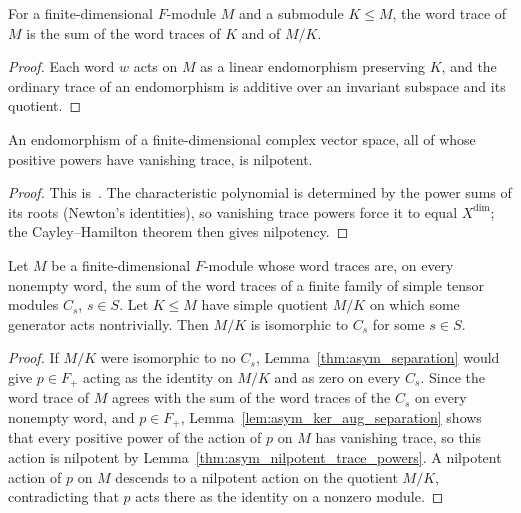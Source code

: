 \begin{lemma}
    \label{lem:asym_trace_additivity}
    \leanok
    For a finite-dimensional $F$-module $M$ and a submodule $K\leq M$, the
    word trace of $M$ is the sum of the word traces of $K$ and of $M/K$.
\end{lemma}

\begin{proof}
    \leanok
    Each word $w$ acts on $M$ as a linear endomorphism preserving $K$, and the
    ordinary trace of an endomorphism is additive over an invariant subspace
    and its quotient.
\end{proof}

\begin{lemma}
    \label{thm:asym_nilpotent_trace_powers}
    \leanok
    An endomorphism of a finite-dimensional complex vector space, all of
    whose positive powers have vanishing trace, is nilpotent.
\end{lemma}

\begin{proof}
    \leanok
    This is~\cite[``Nilpotency from vanishing trace
        powers'']{QICLean2026Blueprint}.
    The characteristic polynomial is determined by the power sums of its
    roots (Newton's identities), so vanishing trace powers force it to
    equal $X^{\dim}$; the Cayley--Hamilton theorem then gives nilpotency.
\end{proof}

\begin{lemma}
    \label{thm:asym_identification}
    \leanok
    Let $M$ be a finite-dimensional $F$-module whose word traces are, on
    every nonempty word, the sum of the word traces of a finite family of
    simple tensor modules $C_s$, $s\in S$. Let $K\leq M$ have simple
    quotient $M/K$ on which some generator acts nontrivially. Then $M/K$ is
    isomorphic to $C_s$ for some $s\in S$.
\end{lemma}

\begin{proof}
    \leanok
    If $M/K$ were isomorphic to no $C_s$, Lemma~\ref{thm:asym_separation}
    would give $p\in F_+$ acting as the identity on $M/K$ and as zero on
    every $C_s$. Since the word trace of $M$ agrees with the sum of the
    word traces of the $C_s$ on every nonempty word, and $p\in F_+$,
    Lemma~\ref{lem:asym_ker_aug_separation} shows that every positive power
    of the action of $p$ on $M$ has vanishing trace, so this action is
    nilpotent by Lemma~\ref{thm:asym_nilpotent_trace_powers}. A nilpotent
    action of $p$ on $M$ descends to a nilpotent action on the quotient
    $M/K$, contradicting that $p$ acts there as the identity on a nonzero
    module.
\end{proof}

